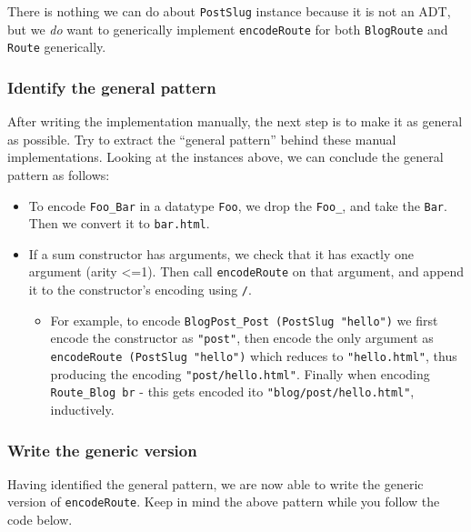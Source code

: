 There is nothing we can do about \texttt{PostSlug} instance because it
is not an ADT, but we \emph{do} want to generically implement
\texttt{encodeRoute} for both \texttt{BlogRoute} and \texttt{Route}
generically.

\hypertarget{identify-the-general-pattern}{%
\subsubsection{Identify the general
pattern}\label{identify-the-general-pattern}}

After writing the implementation manually, the next step is to make it
as general as possible. Try to extract the ``general pattern'' behind
these manual implementations. Looking at the instances above, we can
conclude the general pattern as follows:

\begin{itemize}
\tightlist
\item
  To encode \texttt{Foo\_Bar} in a datatype \texttt{Foo}, we drop the
  \texttt{Foo\_}, and take the \texttt{Bar}. Then we convert it to
  \texttt{bar.html}.
\item
  If a sum constructor has arguments, we check that it has exactly one
  argument (arity \textless=1). Then call \texttt{encodeRoute} on that
  argument, and append it to the constructor's encoding using
  \texttt{/}.

  \begin{itemize}
  \tightlist
  \item
    For example, to encode \texttt{BlogPost\_Post\ (PostSlug\ "hello")}
    we first encode the constructor as \texttt{"post"}, then encode the
    only argument as \texttt{encodeRoute\ (PostSlug\ "hello")} which
    reduces to \texttt{"hello.html"}, thus producing the encoding
    \texttt{"post/hello.html"}. Finally when encoding
    \texttt{Route\_Blog\ br} - this gets encoded ito
    \texttt{"blog/post/hello.html"}, inductively.
  \end{itemize}
\end{itemize}

\hypertarget{write-the-generic-version}{%
\subsubsection{Write the generic
version}\label{write-the-generic-version}}

Having identified the general pattern, we are now able to write the
generic version of \texttt{encodeRoute}. Keep in mind the above pattern
while you follow the code below.

